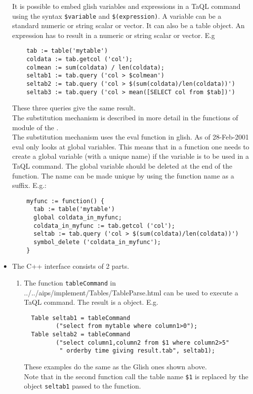 \begin{itemize}
  It is possible to embed glish variables and expressions in a TaQL
  command using the syntax \texttt{\$variable} and
  \texttt{\$(expression)}. A variable can be a standard numeric or
  string scalar or vector. It can also be a table object.
  An expression has to result in a numeric or string scalar or vector.
  E.g
  \begin{verbatim}
    tab := table('mytable')
    coldata := tab.getcol ('col');
    colmean := sum(coldata) / len(coldata);
    seltab1 := tab.query ('col > $colmean')
    seltab2 := tab.query ('col > $(sum(coldata)/len(coldata))')
    seltab3 := tab.query ('col > mean([SELECT col from $tab])')
  \end{verbatim}
  These three queries give the same result.
  \\The substitution mechanism is described in more detail in the
  functions of module
   of the
  .
  \\The substitution mechanism uses the eval function in glish.
  As of 28-Feb-2001 eval only looks at global variables. This means
  that in a function one needs to create a global variable (with
  a unique name) if the variable is to be used in a TaQL command.
  The global variable should be deleted at the end of the function.
  The name can be made unique by using the function name as a suffix.
  E.g.:
  \begin{verbatim}
    myfunc := function() {
      tab := table('mytable')
      global coldata_in_myfunc;
      coldata_in_myfunc := tab.getcol ('col');
      seltab := tab.query ('col > $(sum(coldata)/len(coldata))')
      symbol_delete ('coldata_in_myfunc');
    }
  \end{verbatim}
  
\item
  The C++ interface consists of 2 parts.
  \begin{enumerate}
  \item
    The function \texttt{tableCommand} in
    {../../aips/implement/Tables/TableParse.html}
    can be used to execute a TaQL command. The result is a
    object. E.g.
\begin{verbatim}
  Table seltab1 = tableCommand
         ("select from mytable where column1>0");
  Table seltab2 = tableCommand
         ("select column1,column2 from $1 where column2>5"
          " orderby time giving result.tab", seltab1);
\end{verbatim}
    These examples do the same as the Glish ones shown above.
    \\Note that in the second function call the table name
    \texttt{\$1} is replaced by the object \texttt{seltab1}
    passed to the function.


\end{enumerate}
\end{itemize}
